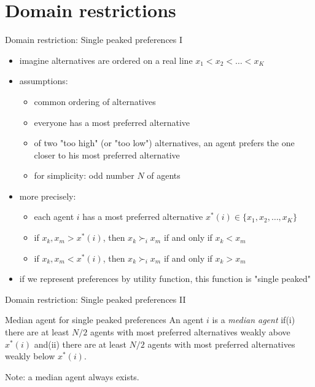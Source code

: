 \documentclass[bigger]{beamer}
\begin{document}
\section{Domain restrictions}
\label{sec:orged7b172}
\begin{frame}[label={sec:orgff35be5}]{Domain restriction: Single peaked preferences I}
\begin{itemize}
\item imagine alternatives are ordered on a real line \(x_1<x_2<\dots <x_K\)
\item assumptions:
\begin{itemize}
\item common ordering of alternatives
\item everyone has a most preferred alternative
\item of two "too high" (or "too low") alternatives, an agent prefers the one closer to his most preferred alternative
\item for simplicity: odd number \(N\) of agents
\end{itemize}

\item more precisely:
\begin{itemize}
\item each agent \(i\) has a most preferred alternative \(x^*(i)\in\{x_1,x_2,\dots,x_K\}\)
\item if \(x_k,x_m>x^*(i)\), then \(x_k\succ_i x_m\) if and only if \(x_k<x_m\)
\item if \(x_k,x_m<x^*(i)\), then \(x_k\succ_i x_m\) if and only if \(x_k>x_m\)
\end{itemize}
\item if we represent preferences by utility function, this function is "single peaked"
\end{itemize}
\end{frame}
\begin{frame}[label={sec:org29e2b87}]{Domain restriction: Single peaked preferences II}
\begin{block}{Median agent for single peaked preferences}
An agent \(i\) is a \emph{median agent} if\linebreak (i) there are at least \(N/2\) agents with most preferred alternatives weakly above \(x^*(i)\) and\linebreak (ii) there are at least \(N/2\) agents with most preferred alternatives weakly below \(x^*(i)\).
\end{block}
Note: a median agent always exists.
\end{frame}
\end{document}
